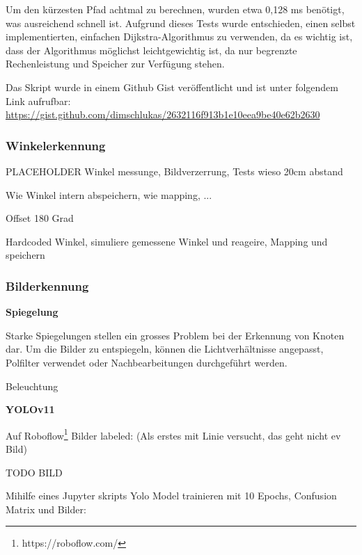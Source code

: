 Um den kürzesten Pfad achtmal zu berechnen, wurden etwa 0,128 ms benötigt, was ausreichend schnell ist. Aufgrund dieses Tests wurde entschieden, einen selbst implementierten, einfachen Dijkstra-Algorithmus zu verwenden, da es wichtig ist, dass der Algorithmus möglichst leichtgewichtig ist, da nur begrenzte Rechenleistung und Speicher zur Verfügung stehen.

Das Skript wurde in einem Github Gist veröffentlicht und ist unter folgendem Link aufrufbar: \url{https://gist.github.com/dimschlukas/2632116f913b1e10eea9be40e62b2630}

\subsubsection{Winkelerkennung}\label{winkelerkennung}

PLACEHOLDER
Winkel messunge, Bildverzerrung, Tests wieso 20cm abstand

Wie Winkel intern abspeichern, wie mapping, ...

Offset 180 Grad


Hardcoded Winkel, simuliere gemessene Winkel und reageire, Mapping und speichern

\subsubsection{Bilderkennung}

\textbf{Spiegelung}

Starke Spiegelungen stellen ein grosses Problem bei der Erkennung von Knoten dar. Um die Bilder zu entspiegeln, können die Lichtverhältnisse angepasst, Polfilter verwendet oder Nachbearbeitungen durchgeführt werden.\cite{avoid-reflection}

Beleuchtung

\textbf{YOLOv11}

Auf Roboflow\footnote{https://roboflow.com/} Bilder labeled: (Als erstes mit Linie versucht, das geht nicht ev Bild) 

TODO BILD

Mihilfe eines Jupyter skripts Yolo Model trainieren mit 10 Epochs, Confusion Matrix und Bilder:

